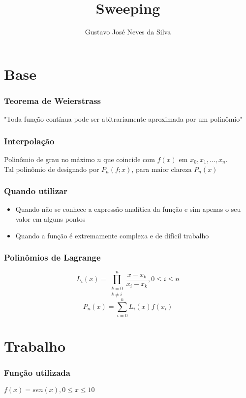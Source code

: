 \documentclass{beamer}
\title{Sweeping}
\author{Gustavo José Neves da Silva}
\date{}
\begin{document}
    
    \begin{frame}
      \titlepage
    \end{frame}
    
\section{Base}

\begin{frame}
  \frametitle{Teorema de Weierstrass}
    "Toda função contínua pode ser abitrariamente aproximada por um polinômio"
\end{frame}

\begin{frame}
  \frametitle{Interpolação}
  Polinômio de grau no máximo $n$ que coincide com $f(x)$ em $x_0, x_1, ..., x_n$.\\
  Tal polinômio de designado por $P_n(f; x)$, para maior clareza $P_n(x)$
\end{frame}

\begin{frame}
  \frametitle{Quando utilizar}
   \begin{itemize}
     \item Quando não se conhece a expressão analítica da função e sim apenas o seu valor em alguns pontos
     \item Quando a função é extremamente complexa e de difícil trabalho
   \end{itemize}
\end{frame}


\begin{frame}
  \frametitle{Polinômios de Lagrange}
  \begin{center}
  \begin{equation} 
      L_i(x) = \displaystyle\prod_{\substack{
        k = 0 \\
        k \neq i
        }}^n
        \frac{x - x_k}{x_i - x_k}, 0 \leq i \leq n
   \end{equation}
   \begin{equation}
    P_n(x) = \displaystyle\sum_{i=0}^{n}L_i(x)f(x_i)
   \end{equation}

   \end{center}
\end{frame}

\section{Trabalho}
\begin{frame}
  \frametitle{Função utilizada}
  \begin{center}
    $f(x)=sen(x), 0 \leq x \leq 10$
  \end{center}

\end{frame}
\end{document}
